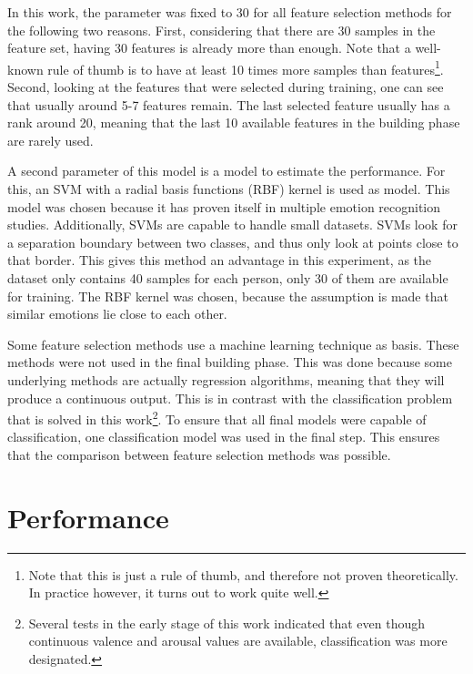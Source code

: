 \npar

In this work, the parameter was fixed to 30 for all feature selection methods for the following two reasons. First, considering that there are 30 samples in the feature set, having 30 features is already more than enough. Note that a well-known rule of thumb is to have at least 10 times more samples than features\citep{rot1,rot2}\footnote{Note that this is just a rule of thumb, and therefore not proven theoretically. In practice however, it turns out to work quite well.}. Second, looking at the features that were selected during training, one can see that usually around 5-7 features remain. The last selected feature usually has a rank around 20, meaning that the last 10 available features in the building phase are rarely used.

\npar
A second parameter of this model is a model to estimate the performance. For this, an SVM with a radial basis functions (RBF) kernel is used as model. This model was chosen because it has proven itself in multiple emotion recognition studies\citep{killyPaper,emorecoghard}. Additionally, SVMs are capable to handle small datasets. SVMs look for a separation boundary between two classes, and thus only look at points close to that border. This gives this method an advantage in this experiment, as the dataset only contains 40 samples for each person, only 30 of them are available for training. The RBF kernel was chosen, because the assumption is made that similar emotions lie close to each other. 

\npar

Some feature selection methods use a machine learning technique as basis. These methods were not used in the final building phase. This was done because some underlying methods are actually regression algorithms, meaning that they will produce a continuous output. This is in contrast with the classification problem that is solved in this work\footnote{Several tests in the early stage of this work indicated that even though continuous valence and arousal values are available, classification was more designated.}. To ensure that all final models were capable of classification, one classification model was used in the final step. This ensures that the comparison between feature selection methods was possible.

\section{Performance}

